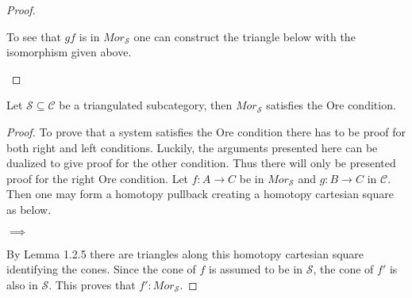 \begin{proof}
\begin{center}
        \end{center}
        To see that $gf$ is in $Mor_\mathcal{S}$ one can construct the triangle below with the isomorphism given above.
        \begin{center}
        \end{center}
    \end{proof}

    \begin{prop}
        Let $\mathcal{S}\subseteq\mathcal{C}$ be a triangulated subcategory, then $Mor_\mathcal{S}$ satisfies the Ore condition.
    \end{prop}

    \begin{proof}
        To prove that a system satisfies the Ore condition there has to be proof for both right and left conditions. Luckily, the arguments presented here can be dualized to give proof for the other condition. Thus there will only be presented proof for the right Ore condition.
        Let $f:A\rightarrow C$ be in $Mor_\mathcal{S}$ and $g:B\rightarrow C$ in $\mathcal{C}$. Then one may form a homotopy pullback creating a homotopy cartesian square as below.
        \begin{center}
            $\implies$
        \end{center}
        By Lemma 1.2.5 there are triangles along this homotopy cartesian square identifying the cones. Since the cone of $f$ is assumed to be in $\mathcal{S}$, the cone of $f'$ is also in $\mathcal{S}$. This proves that $f':Mor_\mathcal{S}$.
    \end{proof}

